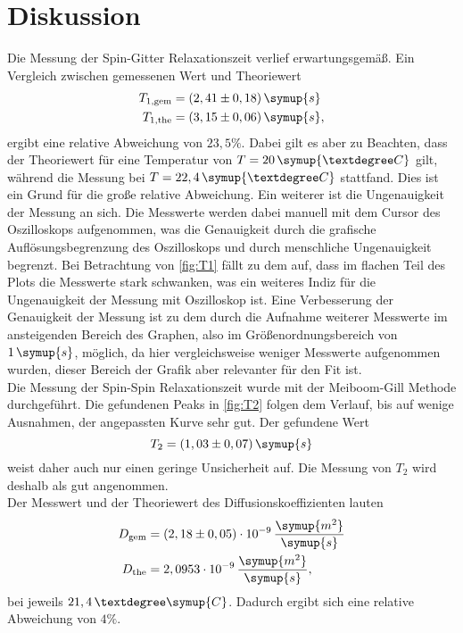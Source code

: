 \section{Diskussion}
Die Messung der Spin-Gitter Relaxationszeit verlief erwartungsgemäß. Ein Vergleich zwischen gemessenen Wert und Theoriewert\cite{SpinGitter}
\begin{align*}
    T_{1, \text{gem}} &= (2,41 \pm 0,18) \, \symup{s} \\
    T_{1, \text{the}} &= (3,15 \pm 0,06) \, \symup{s},
\end{align*}
ergibt eine relative Abweichung von $23,5\%$. Dabei gilt es aber zu Beachten, dass der Theoriewert für eine Temperatur
von $T = 20\,\symup{°C}$ gilt, während die Messung bei $T = 22,4\,\symup{°C}$ stattfand. 
Dies ist ein Grund für die große relative Abweichung. Ein weiterer ist die Ungenauigkeit der Messung an sich.
Die Messwerte werden dabei manuell mit dem Cursor des Oszilloskops aufgenommen, was die Genauigkeit durch 
die grafische Auflösungsbegrenzung des Oszilloskops und durch menschliche Ungenauigkeit begrenzt.
Bei Betrachtung von \autoref{fig:T1} fällt zu dem auf, dass im flachen Teil des Plots die Messwerte 
stark schwanken, was ein weiteres Indiz für die Ungenauigkeit der Messung mit Oszilloskop ist.
Eine Verbesserung der Genauigkeit der Messung ist zu dem durch die Aufnahme weiterer Messwerte
im ansteigenden Bereich des Graphen, also im Größenordnungsbereich von $1\,\symup{s}$, möglich, da 
hier vergleichsweise weniger Messwerte aufgenommen wurden, dieser Bereich der Grafik aber relevanter 
für den Fit ist.\\
Die Messung der Spin-Spin Relaxationszeit wurde mit der Meiboom-Gill Methode durchgeführt.
Die gefundenen Peaks in \autoref{fig:T2} folgen dem Verlauf, bis auf wenige Ausnahmen,
der angepassten Kurve sehr gut. Der gefundene Wert 
\begin{equation*}
    T_2 = (1,03 \pm 0,07) \, \symup{s}
\end{equation*}
weist daher auch nur einen geringe Unsicherheit auf.
Die Messung von $T_2$ wird deshalb als gut angenommen.\\
Der Messwert und der Theoriewert\cite{diff} des Diffusionskoeffizienten lauten 
\begin{align*}
    D_{\text{gem}} &= (2,18 \pm 0,05 ) \cdot 10^{-9} \, \frac{\symup{m^2}}{\symup{s}} \\
    D_{\text{the}} &= 2,0953\cdot 10^{-9} \, \frac{\symup{m^2}}{\symup{s}},
\end{align*}
bei jeweils $21,4 \,°\symup{C}$. Dadurch ergibt sich eine relative Abweichung von $4\%$.
